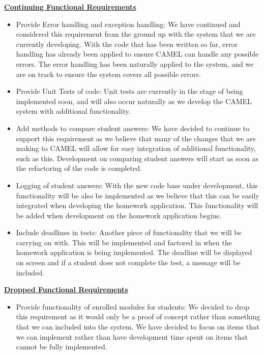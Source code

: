 	\underline{\textbf{Continuing Functional Requirements}}
	\begin{itemize}
		\item Provide Error handling and exception handling: We have continued and considered this requirement from the ground up with the system that we are currently developing. With the code that has been written so far, error handling has already been applied to ensure CAMEL can handle any possible errors. The error handling has been naturally applied to the system, and we are on track to ensure the system covers all possible errors. 
		
		\item Provide Unit Tests of code: Unit tests are currently in the stage of being implemented soon, and will also occur naturally as we develop the CAMEL system with additional functionality. 
		
		\item Add methods to compare student answers: We have decided to continue to support this requirement as we believe that many of the changes that we are making to CAMEL will allow for easy integration of additional functionality, such as this. Development on comparing student answers will start as soon as the refactoring of the code is completed.  
		
		\item Logging of student answers: With the new code base under development, this functionality will be also be implemented as we believe that this can be easily integrated when developing the homework application. This functionality will be added when development on the homework application begins.  
		
		\item Include deadlines in tests: Another piece of functionality that we will be carrying on with. This will be implemented and factored in when the homework application is being implemented. The deadline will be displayed on screen and if a student does not complete the test, a message will be included.  
	\end{itemize}
	
	\underline{\textbf{Dropped Functional Requirements}}
	\begin{itemize}
		\item Provide functionality of enrolled modules for students: We decided to drop this requirement as it would only be a proof of concept rather than something that we can included into the system. We have decided to focus on items that we can implement rather than have development time spent on items that cannot be fully implemented.  
	\end{itemize}
		
